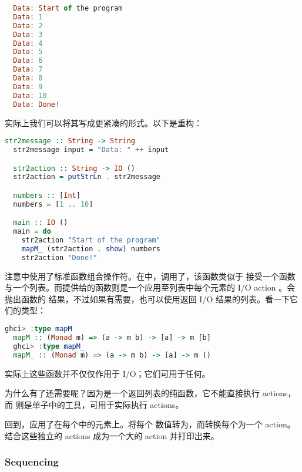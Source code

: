 \documentclass[./main.tex]{subfiles}
\begin{document}
\begin{lstlisting}[language=Haskell]
  % runhaskell actions.hs
  Data: Start of the program
  Data: 1
  Data: 2
  Data: 3
  Data: 4
  Data: 5
  Data: 6
  Data: 7
  Data: 8
  Data: 9
  Data: 10
  Data: Done!
\end{lstlisting}

实际上我们可以将其写成更紧凑的形式。以下是重构：

\begin{lstlisting}[language=Haskell]
  str2message :: String -> String
  str2message input = "Data: " ++ input

  str2action :: String -> IO ()
  str2action = putStrLn . str2message

  numbers :: [Int]
  numbers = [1 .. 10]

  main :: IO ()
  main = do
    str2action "Start of the program"
    mapM_ (str2action . show) numbers
    str2action "Done!"
\end{lstlisting}

注意中使用了标准函数组合操作符。在中，调用了，该函数类似于
接受一个函数与一个列表。而提供给的函数则是一个应用至列表中每个元素的 I/O action 。会抛出函数的
结果，不过如果有需要，也可以使用返回 I/O 结果的列表。看一下它们的类型：

\begin{lstlisting}[language=Haskell]
  ghci> :type mapM
  mapM :: (Monad m) => (a -> m b) -> [a] -> m [b]
  ghci> :type mapM_
  mapM_ :: (Monad m) => (a -> m b) -> [a] -> m ()
\end{lstlisting}

\begin{anote}
  实际上这些函数并不仅仅作用于 I/O；它们可用于任何。
\end{anote}

为什么有了还需要呢？因为是一个返回列表的纯函数，它不能直接执行 actions，而
则是单子中的工具，可用于实际执行 actions。

回到，应用了在每个中的元素上。将每个
数值转为，而转换每个为一个 action。结合这些独立的 actions
成为一个大的 action 并打印出来。

\subsubsection*{Sequencing}
\end{document}
